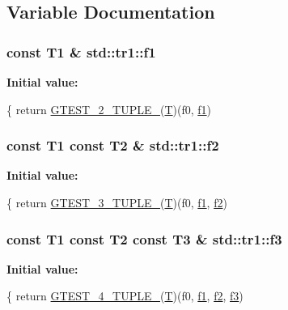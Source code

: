 \subsection{Variable Documentation}
\hypertarget{namespacestd_1_1tr1_a9c0fa65b105f8e2f58ba59ecf75fd000}{
\subsubsection[{f1}]{\setlength{\rightskip}{0pt plus 5cm}const T1 \& std\-::tr1\-::f1}}\label{namespacestd_1_1tr1_a9c0fa65b105f8e2f58ba59ecf75fd000}
{\bfseries Initial value\-:}
\begin{DoxyCode}
\{
  \textcolor{keywordflow}{return} \hyperlink{ts__gtest_8h_a93229c3f009273c73eca237b4d19f326}{GTEST\_2\_TUPLE\_}(\hyperlink{calib3d_8hpp_a3efb9551a871ddd0463079a808916717}{T})(f0, \hyperlink{namespacestd_1_1tr1_a9c0fa65b105f8e2f58ba59ecf75fd000}{f1})
\end{DoxyCode}
\hypertarget{namespacestd_1_1tr1_a87dd9e009868361317f587126dba63d4}{
\subsubsection[{f2}]{\setlength{\rightskip}{0pt plus 5cm}const T1 const T2 \& std\-::tr1\-::f2}}\label{namespacestd_1_1tr1_a87dd9e009868361317f587126dba63d4}
{\bfseries Initial value\-:}
\begin{DoxyCode}
\{
  \textcolor{keywordflow}{return} \hyperlink{ts__gtest_8h_af2c3eab3f1a5197b408fce44eb3ed9da}{GTEST\_3\_TUPLE\_}(\hyperlink{calib3d_8hpp_a3efb9551a871ddd0463079a808916717}{T})(f0, \hyperlink{namespacestd_1_1tr1_a9c0fa65b105f8e2f58ba59ecf75fd000}{f1}, \hyperlink{namespacestd_1_1tr1_a87dd9e009868361317f587126dba63d4}{f2})
\end{DoxyCode}
\hypertarget{namespacestd_1_1tr1_a0f7c3b47d27d42d82d1a333ea420ce4e}{
\subsubsection[{f3}]{\setlength{\rightskip}{0pt plus 5cm}const T1 const T2 const T3 \& std\-::tr1\-::f3}}\label{namespacestd_1_1tr1_a0f7c3b47d27d42d82d1a333ea420ce4e}
{\bfseries Initial value\-:}
\begin{DoxyCode}
\{
  \textcolor{keywordflow}{return} \hyperlink{ts__gtest_8h_a3625feb24d5e6eb9926fd558e4a2e3ff}{GTEST\_4\_TUPLE\_}(\hyperlink{calib3d_8hpp_a3efb9551a871ddd0463079a808916717}{T})(f0, \hyperlink{namespacestd_1_1tr1_a9c0fa65b105f8e2f58ba59ecf75fd000}{f1}, \hyperlink{namespacestd_1_1tr1_a87dd9e009868361317f587126dba63d4}{f2}, \hyperlink{namespacestd_1_1tr1_a0f7c3b47d27d42d82d1a333ea420ce4e}{f3})
\end{DoxyCode}
